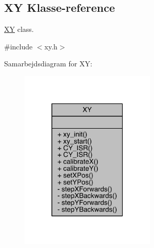\hypertarget{class_x_y}{}\subsection{XY Klasse-\/reference}
\label{class_x_y}


\hyperlink{class_x_y}{XY} class.  




{\ttfamily \#include $<$xy.\+h$>$}



Samarbejdsdiagram for XY\+:\nopagebreak
\begin{figure}[H]
\begin{center}
\leavevmode
\includegraphics[width=183pt]{d5/d40/class_x_y__coll__graph}
\end{center}
\end{figure}
